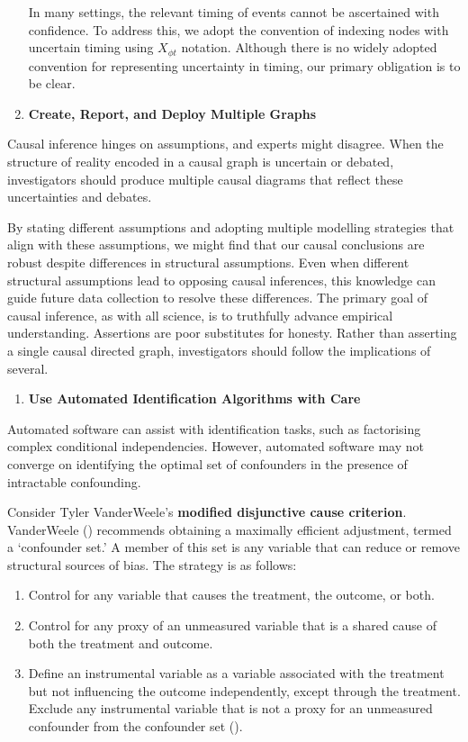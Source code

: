 \documentclass[
  single column]{article}
\providecommand{\tightlist}{%
  \setlength{\itemsep}{0pt}\setlength{\parskip}{0pt}}\usepackage{longtable,booktabs,array}
\begin{document}
\begin{enumerate}
  In many settings, the relevant timing of events cannot be ascertained
  with confidence. To address this, we adopt the convention of indexing
  nodes with uncertain timing using \(X_{\phi t}\) notation. Although
  there is no widely adopted convention for representing uncertainty in
  timing, our primary obligation is to be clear.
\item
  \textbf{Create, Report, and Deploy Multiple Graphs}
\end{enumerate}

Causal inference hinges on assumptions, and experts might disagree. When
the structure of reality encoded in a causal graph is uncertain or
debated, investigators should produce multiple causal diagrams that
reflect these uncertainties and debates.

By stating different assumptions and adopting multiple modelling
strategies that align with these assumptions, we might find that our
causal conclusions are robust despite differences in structural
assumptions. Even when different structural assumptions lead to opposing
causal inferences, this knowledge can guide future data collection to
resolve these differences. The primary goal of causal inference, as with
all science, is to truthfully advance empirical understanding.
Assertions are poor substitutes for honesty. Rather than asserting a
single causal directed graph, investigators should follow the
implications of several.

\begin{enumerate}
\def\labelenumi{\arabic{enumi}.}
\setcounter{enumi}{10}
\tightlist
\item
  \textbf{Use Automated Identification Algorithms with Care}
\end{enumerate}

Automated software can assist with identification tasks, such as
factorising complex conditional independencies. However, automated
software may not converge on identifying the optimal set of confounders
in the presence of intractable confounding.

Consider Tyler VanderWeele's \textbf{modified disjunctive cause
criterion}. VanderWeele ()
recommends obtaining a maximally efficient adjustment, termed a
`confounder set.' A member of this set is any variable that can reduce
or remove structural sources of bias. The strategy is as follows:

\begin{enumerate}
\def\labelenumi{\alph{enumi}.}
\item
  Control for any variable that causes the treatment, the outcome, or
  both.
\item
  Control for any proxy of an unmeasured variable that is a shared cause
  of both the treatment and outcome.
\item
  Define an instrumental variable as a variable associated with the
  treatment but not influencing the outcome independently, except
  through the treatment. Exclude any instrumental variable that is not a
  proxy for an unmeasured confounder from the confounder set
  ().
\end{enumerate}
\end{document}
